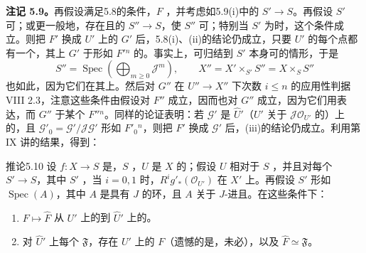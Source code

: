 \textbf{注记 5.9。}再假设满足5.8的条件，$F$ ，并考虑如5.9(i)中的 $S'\to S$。再假设 $S'$ 可；或更一般地，存在且的 $S''\to S$，使 $S''$ 可；特别当 $S'$ 为时，这个条件成立。则把 $F'$ 换成 $U'$ 上的 $G'$ 后，5.8(i)、(ii)的结论仍成立，只要 $U'$ 的每个点都有一个，其上 $G'$ 于形如 $F'{}^n$ 的。事实上，可归结到 $S'$ 本身可的情形，于是
\[
 S''=\operatorname{Spec}\left(\bigoplus_{m\geq0}\mathcal J^m\right),\qquad
 X''=X'\times_{S'}S''=X\times_SS''
\]
也如此，因为它们在其上。然后对 $G''$ 在 $U''\to X''$ 下次数 $i\leq n$ 的应用性判据 VIII 2.3，注意这些条件由假设对 $F''$ 成立，因而也对 $G''$ 成立，因为它们用表达，而 $G''$ 于某个 $F''{}^n$。同样的论证表明：若 $\mathscr G'$ 是 $\widehat U'$（$U'$ 关于 $\mathcal J\mathcal O_{U'}$ 的）上的，且 $\mathscr G'_0=\mathscr G'/\mathcal J\mathscr G'$ 形如 $F'_0{}^n$，则把 $F'$ 换成 $\mathscr G'$ 后，(iii)的结论仍成立。利用第 IX 讲的结果，得到：
\begin{SGAresult}{推论}{5.10}
设 $f:X\to S$ 是，$S$ ，$U$ 是 $X$ 的；假设 $U$ 相对于 $S$ ，并且对每个 $S'\to S$，其中 $S'$ ，当 $i=0,1$ 时，$R^ig'_*(\mathcal O_{U'})$ 在 $X'$ 上。再假设 $S'$ 形如 $\operatorname{Spec}(A)$，其中 $A$ 是具有 $J$ 的环，且 $A$ 关于 $J$-进且。在这些条件下：
\begin{enumerate}
\item[(i)]  $F\mapsto\widehat F$ 从 $U'$ 上的到 $\widehat U'$ 上的。
\item[(ii)] 对 $\widehat U'$ 上每个 $\mathfrak F$，存在 $U'$ 上的 $F$（遗憾的是，未必），以及 $\widehat F\simeq\mathfrak F$。
\end{enumerate}
\end{SGAresult}
